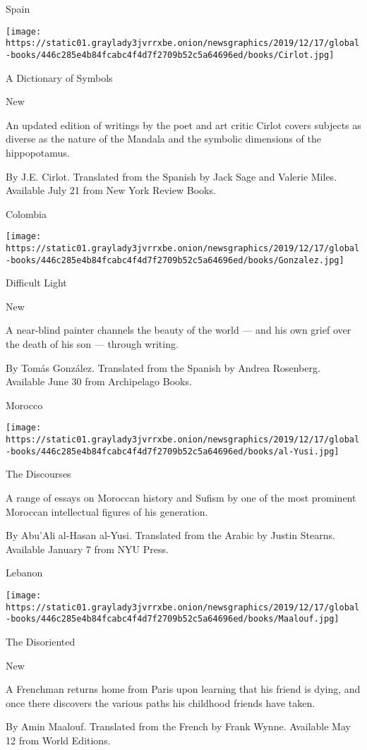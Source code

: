 Spain

\texttt{[image: https://static01.graylady3jvrrxbe.onion/newsgraphics/2019/12/17/global-books/446c285e4b84fcabc4f4d7f2709b52c5a64696ed/books/Cirlot.jpg]}

A Dictionary of Symbols

New

An updated edition of writings by the poet and art critic Cirlot covers
subjects as diverse as the nature of the Mandala and the symbolic
dimensions of the hippopotamus.

 By J.E. Cirlot. Translated from the Spanish by Jack Sage and Valerie
Miles. Available July 21 from New York Review Books.

Colombia

\texttt{[image: https://static01.graylady3jvrrxbe.onion/newsgraphics/2019/12/17/global-books/446c285e4b84fcabc4f4d7f2709b52c5a64696ed/books/Gonzalez.jpg]}

Difficult Light

New

A near-blind painter channels the beauty of the world --- and his own
grief over the death of his son --- through writing.

 By Tomás González. Translated from the Spanish by Andrea Rosenberg.
Available June 30 from Archipelago Books.

Morocco

\texttt{[image: https://static01.graylady3jvrrxbe.onion/newsgraphics/2019/12/17/global-books/446c285e4b84fcabc4f4d7f2709b52c5a64696ed/books/al-Yusi.jpg]}

The Discourses

A range of essays on Moroccan history and Sufism by one of the most
prominent Moroccan intellectual figures of his generation.

 By Abu'Ali al-Hasan al-Yusi. Translated from the Arabic by Justin
Stearns. Available January 7 from NYU Press.

Lebanon

\texttt{[image: https://static01.graylady3jvrrxbe.onion/newsgraphics/2019/12/17/global-books/446c285e4b84fcabc4f4d7f2709b52c5a64696ed/books/Maalouf.jpg]}

The Disoriented

New

A Frenchman returns home from Paris upon learning that his friend is
dying, and once there discovers the various paths his childhood friends
have taken.

 By Amin Maalouf. Translated from the French by Frank Wynne. Available
May 12 from World Editions.

